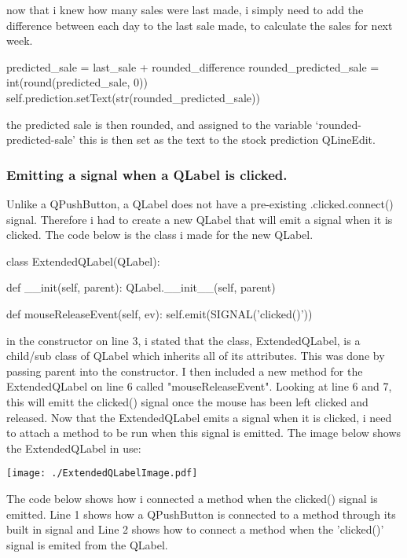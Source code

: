 now that i knew how many sales were last made, i simply need to add the difference between each day to the last sale made, to calculate the sales for next week.

\begin{python}
predicted_sale = last_sale + rounded_difference
rounded_predicted_sale = int(round(predicted_sale, 0))
self.prediction.setText(str(rounded_predicted_sale))
\end{python}

the predicted sale is then rounded, and assigned to the variable `rounded-predicted-sale' this is then set as the text to the stock prediction QLineEdit.

\pagebreak

\subsubsection{Emitting a signal when a QLabel is clicked.}

Unlike a QPushButton, a QLabel does not have a pre-existing .clicked.connect() signal. Therefore i had to create a new QLabel that will emit a signal when it is clicked. The code below is the class i made for the new QLabel.

\begin{python}
class ExtendedQLabel(QLabel):
 
    def __init(self, parent):
        QLabel.__init__(self, parent)
 
    def mouseReleaseEvent(self, ev):
        self.emit(SIGNAL('clicked()'))
\end{python}

in the constructor on line 3, i stated that the class, ExtendedQLabel, is a child/sub class of QLabel which inherits all of its attributes. This was done by passing parent into the constructor. I then included a new method for the ExtendedQLabel on line 6 called "mouseReleaseEvent". Looking at line 6 and 7, this will emitt the clicked() signal once the mouse has been left clicked and released. Now that the ExtendedQLabel emits a signal when it is clicked, i need to attach a method to be run when this signal is emitted. The image below shows the ExtendedQLabel in use:

\texttt{[image: ./ExtendedQLabelImage.pdf]}

The code below shows how i connected a method when the clicked() signal is emitted. Line 1 shows how a QPushButton is connected to a method through its built in signal and Line 2 shows how to connect a method when the 'clicked()' signal is emited from the QLabel.


